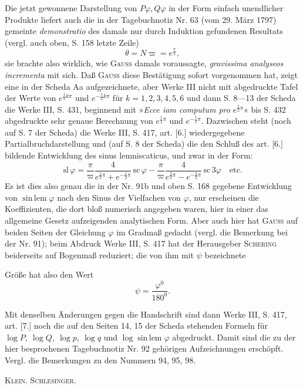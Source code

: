 Die jetzt gewonnene Darstellung von \(P\varphi,Q\varphi\) in der Form einfach unendlicher Produkte liefert auch die in der Tagebuchnotiz Nr. 63 (vom 29. März 1797) gemeinte \textit{demonstratio} des damals nur durch Induktion gefundenen Resultats (vergl. auch oben, S. 158 letzte Zeile)
\[
\theta=N\varpi=e^{\frac\pi2},
\]
\noindent sie brachte also wirklich, wie \textsc{Gauss} damals voraussagte, \textit{gravissima analyseos incrementa} mit sich. Daß \textsc{Gauss} diese Bestätigung sofort vorgenommen hat, zeigt eine in der Scheda Aa aufgezeichnete, aber Werke III nicht mit abgedruckte Tafel der Werte von \(e^{\frac12 k\pi}\) und \(e^{-\frac12 k\pi}\) für \(k=1,2,3,4,5,6\) und dann S. 8—13 der Scheda die Werke III, S. 431, beginnend mit »\textit{Ecce iam computum pro} \(e^{\frac12\pi}\)« bis S. 432 abgedruckte sehr genaue Berechnung von \(e^{\frac12\pi}\) und \(e^{-\frac12\pi}\). Dazwischen steht (noch auf S. 7 der Scheda) die Werke III, S. 417, art. [6.] wiedergegebene Partialbruchdarstellung und (auf S. 8 der Scheda) die den Schluß des art. [6.] bildende Entwicklung des sinus lemniscaticus, und zwar in der Form:
\[
\mathrm{sl}\,\varphi=\frac\pi\varpi\frac4{e^{\frac12\pi}+e^{-\frac12\pi}}\,\mathrm{sc}\,\varphi-\frac\pi\varpi\frac4{e^{\frac32\pi}-e^{-\frac32\pi}}\,\mathrm{sc}\,3\varphi\quad\text{etc.}
\]
\noindent Es ist dies also genau die in der Nr. 91b und oben S. 168 gegebene Entwicklung von \(\operatorname{sin\,lem}\varphi\) nach den Sinus der Vielfachen von \(\varphi\), nur erscheinen die Koeffizienten, die dort bloß numerisch angegeben waren, hier in einer das allgemeine Gesetz aufzeigenden analytischen Form. Aber auch hier hat \textsc{Gauss} auf beiden Seiten der Gleichung \(\varphi\) im Gradmaß gedacht (vergl. die Bemerkung bei der Nr. 91); beim Abdruck Werke III, S. 417 hat der Herausgeber \textsc{Schering} beiderseits auf Bogenmaß reduziert; die von ihm mit \(\psi\) bezeichnete
\par\endgroup

\clearpage{}
\begingroup\small
\noindent Größe hat also den Wert
\[
\psi=\frac{\varphi^0}{180^0}.
\]

Mit denselben Änderungen gegen die Handschrift sind dann Werke III, S. 417, art. [7.] noch die auf den Seiten 14, 15 der Scheda stehenden Formeln für \(\log P,\ \log Q,\ \log p,\ \log q\) und \(\log\operatorname{sin\,lem}\varphi\) abgedruckt. Damit sind die zu der hier besprochenen Tagebuchnotiz Nr. 92 gehörigen Aufzeichnungen erschöpft. Vergl. die Bemerkungen zu den Nummern 94, 95, 98.
\par\noindent\hfill\textsc{Klein. Schlesinger.}
\par\endgroup

